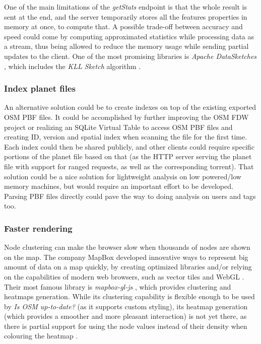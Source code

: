 \documentclass{Configuration_Files/PoliMi3i_thesis}
\begin{document}
One of the main limitations of the \textit{getStats} endpoint is that the whole result is sent at the end, and the server temporarily stores all the features properties in memory at once, to compute that. A possible trade-off between accuracy and speed could come by computing approximated statistics while processing data as a stream, thus being allowed to reduce the memory usage while sending partial updates to the client. One of the most promising libraries is \textit{Apache DataSketches} \cite{ApacheDataSketchesCore2022}, which includes the \textit{KLL Sketch} algorithm \cite{karninOptimalQuantileApproximation2016}.

\subsubsection{Index planet files}

An alternative solution could be to create indexes on top of the existing exported OSM PBF files. It could be accomplished by further improving the OSM FDW project or realizing an SQLite Virtual Table to access OSM PBF files and creating ID, version and spatial index when scanning the file for the first time. Each index could then be shared publicly, and other clients could require specific portions of the planet file based on that (as the HTTP server serving the planet file with support for ranged requests, as well as the corresponding torrent). That solution could be a nice solution for lightweight analysis on low powered/low memory machines, but would require an important effort to be developed. Parsing PBF files directly could pave the way to doing analysis on users and tags too.

\subsubsection{Faster rendering}

Node clustering can make the browser slow when thousands of nodes are shown on the map. The company MapBox \cite{MapsGeocodingNavigation} developed innovative ways to represent big amount of data on a map quickly, by creating optimized libraries and/or relying on the capabilities of modern web browsers, such as vector tiles and WebGL \cite{WebGL2011}. Their most famous library is \textit{mapbox-gl-js} \cite{MapboxMapboxgljsInteractive}, which provides clustering and heatmaps generation. While its clustering capability is flexible enough to be used by \textit{Is OSM up-to-date?} (as it supports custom styling), its heatmap generation (which provides a smoother and more pleasant interaction) is not yet there, as there is partial support for using the node values instead of their density when colouring the heatmap \cite{ProposalHeatmapLayer}.
\end{document}
